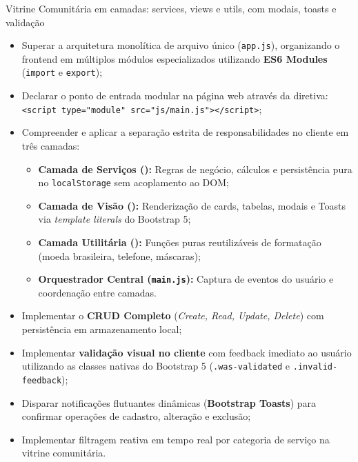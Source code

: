   {Vitrine Comunitária em camadas: services, views e utils, com modais, toasts e validação}
  {\hspace{4pt}
   \hspace{4pt}
   }

\vspace{0.4em}

\begin{boxObjetivos}
\begin{itemize}
\item Superar a arquitetura monolítica de arquivo único (\texttt{app.js}), organizando o frontend em múltiplos módulos especializados utilizando \textbf{ES6 Modules} (\texttt{import} e \texttt{export});
\item Declarar o ponto de entrada modular na página web através da diretiva:\\ \texttt{<script type="module" src="js/main.js"></script>};
\item Compreender e aplicar a separação estrita de responsabilidades no cliente em três camadas:
  \begin{itemize}
    \item \textbf{Camada de Serviços ():} Regras de negócio, cálculos e persistência pura no \texttt{localStorage} sem acoplamento ao DOM;
    \item \textbf{Camada de Visão ():} Renderização de cards, tabelas, modais e Toasts via \textit{template literals} do Bootstrap 5;
    \item \textbf{Camada Utilitária ():} Funções puras reutilizáveis de formatação (moeda brasileira, telefone, máscaras);
    \item \textbf{Orquestrador Central (\texttt{main.js}):} Captura de eventos do usuário e coordenação entre camadas.
  \end{itemize}
\item Implementar o \textbf{CRUD Completo} (\textit{Create, Read, Update, Delete}) com persistência em armazenamento local;
\item Implementar \textbf{validação visual no cliente} com feedback imediato ao usuário utilizando as classes nativas do Bootstrap 5 (\texttt{.was-validated} e \texttt{.invalid-feedback});
\item Disparar notificações flutuantes dinâmicas (\textbf{Bootstrap Toasts}) para confirmar operações de cadastro, alteração e exclusão;
\item Implementar filtragem reativa em tempo real por categoria de serviço na vitrine comunitária.
\end{itemize}
\end{boxObjetivos}

